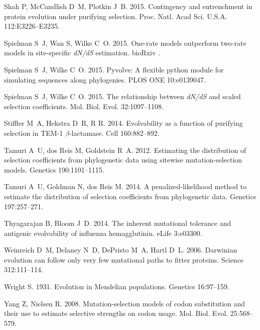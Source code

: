\documentclass[11pt]{article}
\begin{document}
\begin{thebibliography}{38}
Shah P, McCandlish D~M, Plotkin J~B. 2015.
\newblock Contingency and entrenchment in protein evolution under purifying
  selection.
\newblock Proc. Natl. Acad Sci. U.S.A. 112:E3226--E3235.

Spielman S~J, Wan S, Wilke C~O. 2015.
\newblock One-rate models outperform two-rate models in site-specific
  \emph{dN/dS} estimation.
\newblock bioRxiv .

Spielman S~J, Wilke C~O. 2015{}.
\newblock Pyvolve: A flexible python module for simulating sequences along
  phylogenies.
\newblock PLOS ONE 10:e0139047.

Spielman S~J, Wilke C~O. 2015{}.
\newblock The relationship between \emph{dN/dS} and scaled selection
  coefficients.
\newblock Mol. Biol. Evol. 32:1097--1108.

Stiffler M~A, Hekstra D~R, R R. 2014.
\newblock Evolvability as a function of purifying selection in {TEM-1
  $\beta$}-lactamase.
\newblock Cell 160:882--892.

Tamuri A~U, {dos Reis} M, Goldstein R~A. 2012.
\newblock Estimating the distribution of selection coefficients from
  phylogenetic data using sitewise mutation-selection models.
\newblock Genetics 190:1101--1115.

Tamuri A~U, Goldman N, {dos Reis} M. 2014.
\newblock A penalized-likelihood method to estimate the distribution of
  selection coefficients from phylogenetic data.
\newblock Genetics 197:257--271.

Thyagarajan B, Bloom J~D. 2014.
\newblock The inherent mutational tolerance and antigenic evolvability of
  influenza hemagglutinin.
\newblock eLife 3:e03300.

Weinreich D~M, Delaney N~D, DePristo M~A, Hartl D~L. 2006.
\newblock Darwinian evolution can follow only very few mutational paths to
  fitter proteins.
\newblock Science 312:111--114.

Wright S. 1931.
\newblock Evolution in {Mendelian} populations.
\newblock Genetics 16:97--159.

Yang Z, Nielsen R. 2008.
\newblock Mutation-selection models of codon substitution and their use to
  estimate selective strengths on codon usage.
\newblock Mol. Biol. Evol. 25:568--579.

\end{thebibliography}
\end{document}
